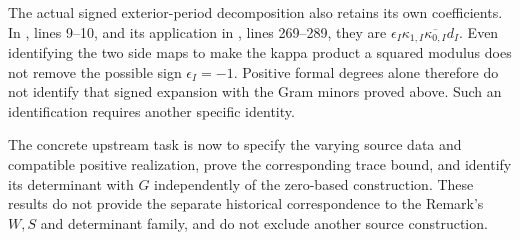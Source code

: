 The actual signed exterior-period decomposition also retains its
own coefficients. In
,
lines 9--10, and its application in
,
lines 269--289, they are
\(\epsilon_I\kappa_{1,I}\overline{\kappa_{0,I}}d_I\).
Even identifying the two side maps to make the kappa product a
squared modulus does not remove the possible sign
\(\epsilon_I=-1\). Positive formal degrees alone therefore
do not identify that signed expansion with the Gram minors proved
above. Such an identification requires another specific identity.

The concrete upstream task is now to specify the varying source
data and compatible positive realization, prove the corresponding
trace bound, and identify its determinant with \(G\) independently
of the zero-based construction. These results do not provide the
separate historical correspondence to the Remark's \(W,S\) and
determinant family, and do not exclude another source construction.
